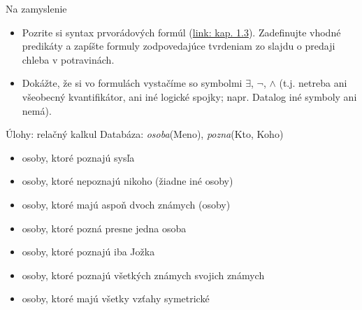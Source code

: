 \documentclass[12pt]{beamer}
\begin{document}
\begin{frame}{Na zamyslenie}
\begin{itemize}
\item Pozrite si syntax prvorádových formúl (\href{http://www.dcs.fmph.uniba.sk/texty/dsmain.pdf}{link: kap. 1.3}).
    Zadefinujte vhodné predikáty a zapíšte formuly zodpovedajúce tvrdeniam zo slajdu o predaji chleba v potravinách.
\item Dokážte, že si vo formulách vystačíme so symbolmi $\exists$, $\lnot$, $\land$
    (t.j. netreba ani všeobecný kvantifikátor, ani iné logické spojky; napr. Datalog iné symboly ani nemá).
\end{itemize}
\end{frame}


\begin{frame}{Úlohy: relačný kalkul}
Databáza: \emph{osoba}(Meno), \emph{pozna}(Kto, Koho)
\begin{itemize}
    \item osoby, ktoré poznajú sysľa
    \item osoby, ktoré nepoznajú nikoho (žiadne iné osoby)
    \item osoby, ktoré majú aspoň dvoch známych (osoby)
    \item osoby, ktoré pozná presne jedna osoba
    \item osoby, ktoré poznajú iba Jožka
    \item osoby, ktoré poznajú všetkých známych svojich známych
    \item osoby, ktoré majú všetky vzťahy symetrické
\end{itemize}
\end{frame}
\end{document}
